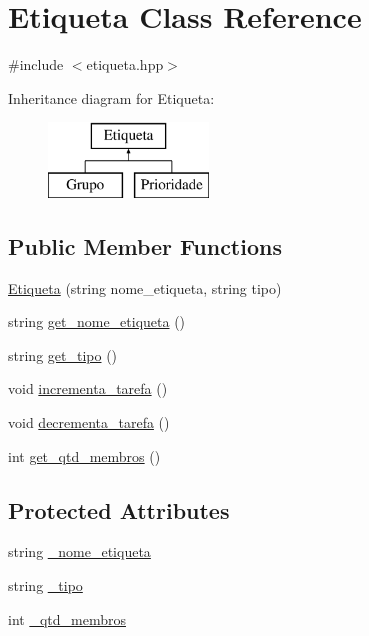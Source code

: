 \hypertarget{classEtiqueta}{}\section{Etiqueta Class Reference}
\label{classEtiqueta}


{\ttfamily \#include $<$etiqueta.\+hpp$>$}

Inheritance diagram for Etiqueta\+:\begin{figure}[H]
\begin{center}
\leavevmode
\includegraphics[height=2.000000cm]{classEtiqueta}
\end{center}
\end{figure}
\subsection*{Public Member Functions}
\begin{DoxyCompactItemize}
\item 
\hyperlink{classEtiqueta_aef0684cb6dc41c4f6f602b184ec64bce}{Etiqueta} (string nome\+\_\+etiqueta, string tipo)
\item 
string \hyperlink{classEtiqueta_a19d4e9c998e6b7fab0dafc88e9c7b9e2}{get\+\_\+nome\+\_\+etiqueta} ()
\item 
string \hyperlink{classEtiqueta_a27ea122e50442c29d7021fbe374ae4ea}{get\+\_\+tipo} ()
\item 
void \hyperlink{classEtiqueta_a1e19fda758d2d6118a3f9f8763bf50c2}{incrementa\+\_\+tarefa} ()
\item 
void \hyperlink{classEtiqueta_a01a51067b14191eba6f0fd7ac5d7a5bb}{decrementa\+\_\+tarefa} ()
\item 
int \hyperlink{classEtiqueta_a46c86502abf12a5824f1421a452fe239}{get\+\_\+qtd\+\_\+membros} ()
\end{DoxyCompactItemize}
\subsection*{Protected Attributes}
\begin{DoxyCompactItemize}
\item 
string \hyperlink{classEtiqueta_ad33c17ad4b54e7e8a1a760650747ee71}{\+\_\+nome\+\_\+etiqueta}
\item 
string \hyperlink{classEtiqueta_af4097d8bb6e190bb32c6bf70177f8b0c}{\+\_\+tipo}
\item 
int \hyperlink{classEtiqueta_af72d9ff60b84f4635e78f12ec8f80dab}{\+\_\+qtd\+\_\+membros}
\end{DoxyCompactItemize}


